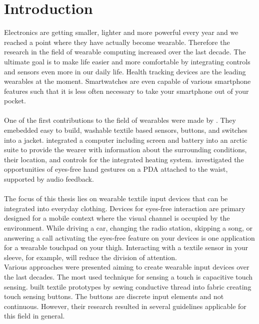 %

\chapter{Introduction}
\label{introduction}
 
Electronics are getting smaller, lighter and more powerful every year and we reached a point where they have actually become wearable. Therefore the research in the field of wearable computing increased over the last decade. The ultimate goal is to make life easier and more comfortable by integrating controls and sensors even more in our daily life. Health tracking devices are the leading wearables at the moment. Smartwatches are even capable of various smartphone features such that it is less often necessary to take your smartphone out of your pocket. \\ \\
One of the first contributions to the field of wearables were made by \cite{post1997smart}. They emebedded easy to build, washable textile based sensors, buttons, and switches into a jacket. \cite{Rantanen:2002:SCP:594096.594098} integrated a computer including  screen and battery into an arctic suite to provide the wearer with information about the surrounding conditions, their location, and controls for the integrated heating system. \cite{Brewster:2003:MEI:642611.642694} investigated the opportunities of eyes-free hand gestures on a PDA attached to the waist, supported by audio feedback.\\ \\
The focus of this thesis lies on wearable textile input devices that can be integrated into everyday clothing. Devices for eyes-free interaction are primary designed for a mobile context where the visual channel is occupied by the environment. While driving a car, changing the radio station, skipping a song, or answering a call activating the eyes-free feature on your devices is one application for a wearable touchpad on your thigh. Interacting with a textile sensor in your sleeve, for example, will reduce the division of attention.\\
Various approaches were presented aiming to create wearable input devices over the last decades. The most used technique for sensing a touch is capacitive touch  sensing. \citep{Holleis:2008:ECT:1409240.1409250} built textile prototypes by sewing conductive thread into fabric creating touch sensing buttons. The buttons are discrete input elements and not continuous. However, their research resulted in several guidelines applicable for this field in general. \\ \\
